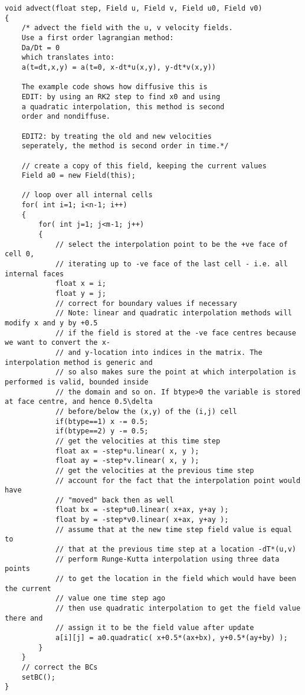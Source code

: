 \documentclass[notitlepage]{article}
\begin{document}
\begin{lstlisting}[style=myCpp]
void advect(float step, Field u, Field v, Field u0, Field v0)
{
	/* advect the field with the u, v velocity fields.
	Use a first order lagrangian method:
	Da/Dt = 0
	which translates into:
	a(t=dt,x,y) = a(t=0, x-dt*u(x,y), y-dt*v(x,y))
	
	The example code shows how diffusive this is 
	EDIT: by using an RK2 step to find x0 and using
	a quadratic interpolation, this method is second
	order and nondiffuse.
	
	EDIT2: by treating the old and new velocities 
	seperately, the method is second order in time.*/
	
	// create a copy of this field, keeping the current values
	Field a0 = new Field(this);
	
	// loop over all internal cells
	for( int i=1; i<n-1; i++)
	{
		for( int j=1; j<m-1; j++)
		{
			// select the interpolation point to be the +ve face of cell 0,
			// iterating up to -ve face of the last cell - i.e. all internal faces
			float x = i;
			float y = j;
			// correct for boundary values if necessary
			// Note: linear and quadratic interpolation methods will modify x and y by +0.5
			// if the field is stored at the -ve face centres because we want to convert the x-
			// and y-location into indices in the matrix. The interpolation method is generic and
			// so also makes sure the point at which interpolation is performed is valid, bounded inside
			// the domain and so on. If btype>0 the variable is stored at face centre, and hence 0.5\delta
			// before/below the (x,y) of the (i,j) cell
			if(btype==1) x -= 0.5;
			if(btype==2) y -= 0.5;
			// get the velocities at this time step
			float ax = -step*u.linear( x, y );
			float ay = -step*v.linear( x, y );
			// get the velocities at the previous time step
			// account for the fact that the interpolation point would have
			// "moved" back then as well
			float bx = -step*u0.linear( x+ax, y+ay );
			float by = -step*v0.linear( x+ax, y+ay );
			// assume that at the new time step field value is equal to
			// that at the previous time step at a location -dT*(u,v)
			// perform Runge-Kutta interpolation using three data points
			// to get the location in the field which would have been the current
			// value one time step ago
			// then use quadratic interpolation to get the field value there and
			// assign it to be the field value after update
			a[i][j] = a0.quadratic( x+0.5*(ax+bx), y+0.5*(ay+by) );
		}
	}
	// correct the BCs
	setBC();
}
\end{lstlisting}
\end{document}
